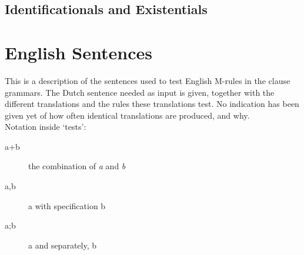 \subsection{Identificationals and Existentials}
\begin{zinnen}
\end{zinnen}

\newpage
\section{English Sentences}
This is a description of the sentences used to test English M-rules in the 
clause grammars. The Dutch
sentence needed as input is given, together with the different translations and
the rules these translations test. No indication has been given yet of how 
often identical translations are produced, and why.\\
Notation inside `tests':
\begin{description}
\item[a+b] the combination of {\em a} and {\em b}
\item[a,b] a with specification b
\item[a;b] a and separately, b
\end{description}

